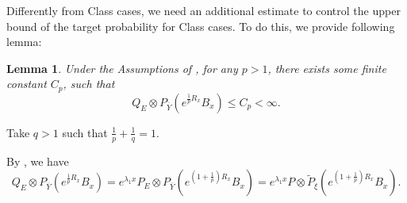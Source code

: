 \documentclass[]{article}
\makeatletter
\numberwithin{equation}{section}
\renewenvironment{proof}[1][\proofname]{%
	\par\pushQED{\qed}\normalfont%
	\topsep6\p@\@plus6\p@\relax
	\trivlist\item[\hskip\labelsep\bfseries#1\@addpunct{.}]%
	\ignorespaces
}{%
	\popQED\endtrivlist\@endpefalse
}
\theoremstyle{thmstyleone}%
\theoremstyle{thmstyletwo}%
\theoremstyle{thmstylethree}%
\theoremstyle{thmstylefour}%
\newtheorem{lemma}{Lemma}
\theoremstyle{thmstylefive}%
\theoremstyle{thmstylesix}%
\makeatother
\begin{document}
	
	Differently from Class  cases, we need an additional estimate to control the upper bound of the target probability for Class  cases. To do this, we provide following lemma:
	
	\begin{lemma}\label{Modified Upper Estimate}
		Under the Assumptions of , for any $p>1$, there exists some finite constant $C_p$, such that
		\begin{equation}
			Q_E\otimes P_{\overline{Y}} \left( e^{\frac{1}{p}R_x}B_x \right) \leqslant C_p<\infty.
		\end{equation}
	\end{lemma}
	
	\begin{proof}[Proof of \Cref{Modified Upper Estimate}]
		Take $q>1$ such that $\frac{1}{p}+\frac{1}{q}=1$.
		
		By , we have
		\begin{equation*}
			Q_E\otimes P_{\overline{Y}} \left( e^{\frac{1}{p}R_x}B_x \right)
			=
			e^{\lambda_1 x}
			P_E\otimes P_{\overline{Y}} \left(e^{(1+\frac{1}{p})R_x} B_x\right)
			=
			e^{\lambda_1 x}
			P\otimes \tilde{P}_\xi\left(e^{(1+\frac{1}{p})R_x}B_x\right).
		\end{equation*}
		

\end{proof}
\end{document}
